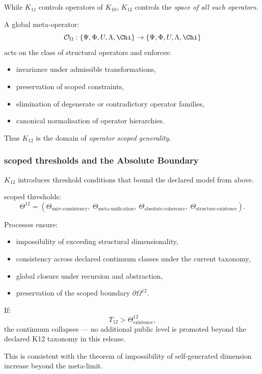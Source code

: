 While $K_{11}$ controls operators of $K_{10}$,
$K_{12}$ controls the \emph{space of all such operators}.

A global meta-operator:
\[
\mathcal{O}_{\Omega} : \{\Psi, \Phi, U, \Lambda, \Chi\} \to
            \{\Psi, \Phi, U, \Lambda, \Chi\}
\]
acts on the class of structural operators and enforces:
\begin{itemize}
    \item invariance under admissible transformations,
    \item preservation of scoped constraints,
    \item elimination of degenerate or contradictory operator families,
    \item canonical normalisation of operator hierarchies.
\end{itemize}

Thus $K_{12}$ is the domain of \emph{operator scoped generality}.

\subsubsection{scoped thresholds and the Absolute Boundary}

$K_{12}$ introduces threshold conditions that bound
the declared model from above.

scoped thresholds:
\[
\Theta^{12} =
(\Theta_{\text{univ-consistency}},\
 \Theta_{\text{meta-unification}},\
 \Theta_{\text{absolute-coherence}},\
 \Theta_{\text{structure-existence}}).
\]

Processes ensure:
\begin{itemize}
    \item impossibility of exceeding structural dimensionality,
    \item consistency across declared continuum classes under the current taxonomy,
    \item global closure under recursion and abstraction,
    \item preservation of the scoped boundary $\partial\Omega^{12}$.
\end{itemize}

If:
\[
T_{12} > \Theta^{12}_{\text{existence}},
\]
the continuum collapses --- no additional public level is promoted beyond the declared K12 taxonomy in this release.

This is consistent with the theorem of impossibility of
self-generated dimension increase beyond the meta-limit.

